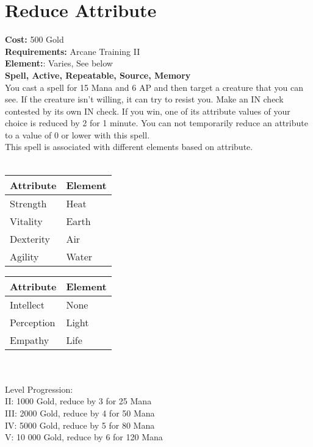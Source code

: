 \section*{Reduce Attribute}
\textbf{Cost:} 500 Gold\\
\textbf{Requirements:} Arcane Training II\\
\textbf{Element:}: Varies, See below\\
\textbf{Spell, Active, Repeatable, Source, Memory}\\
You cast a spell for 15 Mana and 6 AP and then target a creature that you can see. If the creature isn’t willing, it can try to resist you. Make an IN check contested by its own IN check. If you win, one of its attribute values of your choice is reduced by 2 for 1 minute. You can not temporarily reduce an attribute to a value of 0 or lower with this spell. \\
This spell is associated with different elements based on attribute.\\
\\
\begin{minipage}{0.5\textwidth}
	\begin{tabular}{l | l} 
		Attribute & Element\\ \hline
		Strength & Heat\\
		Vitality & Earth\\
		Dexterity & Air\\
		Agility & Water\\
	\end{tabular}
\end{minipage}
\begin{minipage}{0.5\textwidth}
	\begin{tabular}{l | l}
		Attribute & Element\\ \hline
		Intellect & None\\
		Perception & Light\\
		Empathy & Life\\
	\end{tabular}
\end{minipage}
\\
\\
Level Progression:\\
II: 1000 Gold, reduce by 3 for 25 Mana\\
III: 2000 Gold, reduce by 4 for 50 Mana\\
IV: 5000 Gold, reduce by 5 for 80 Mana\\
V: 10 000 Gold, reduce by 6 for 120 Mana\\